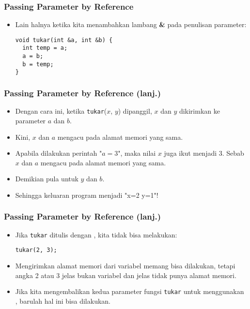 \begin{frame}[fragile]
\frametitle{Passing Parameter by Reference}
\begin{itemize}
  \item Lain halnya ketika kita menambahkan lambang \textbf{\&} pada penulisan parameter:
\begin{lstlisting}
void tukar(int &a, int &b) {
  int temp = a;
  a = b;
  b = temp;
}
\end{lstlisting}
\end{itemize}
\end{frame}

\begin{frame}[fragile]
\frametitle{Passing Parameter by Reference (lanj.)}
\begin{itemize}
  \item Dengan cara ini, ketika \texttt{tukar}($x$, $y$) dipanggil,  $x$ dan $y$ dikirimkan ke parameter $a$ dan $b$.
  \item Kini, $x$ dan $a$ mengacu pada alamat memori yang sama.
  \item Apabila dilakukan perintah "$a = 3$", maka nilai $x$ juga ikut menjadi 3. Sebab $x$ dan $a$ mengacu pada alamat memori yang sama.
  \item Demikian pula untuk $y$ dan $b$.
  \item Sehingga keluaran program menjadi "x=2 y=1"!
\end{itemize}
\end{frame}

\begin{frame}[fragile]
\frametitle{Passing Parameter by Reference (lanj.)}
\begin{itemize}
  \item Jika \texttt{tukar} ditulis dengan , kita tidak bisa melakukan:
\begin{lstlisting}
tukar(2, 3);
\end{lstlisting}

  \item Mengirimkan alamat memori dari variabel memang bisa dilakukan, tetapi angka 2 atau 3 jelas bukan variabel dan jelas tidak punya alamat memori.
  \item Jika kita mengembalikan kedua parameter fungsi \texttt{tukar} untuk menggunakan , barulah hal ini bisa dilakukan.
\end{itemize}
\end{frame}

